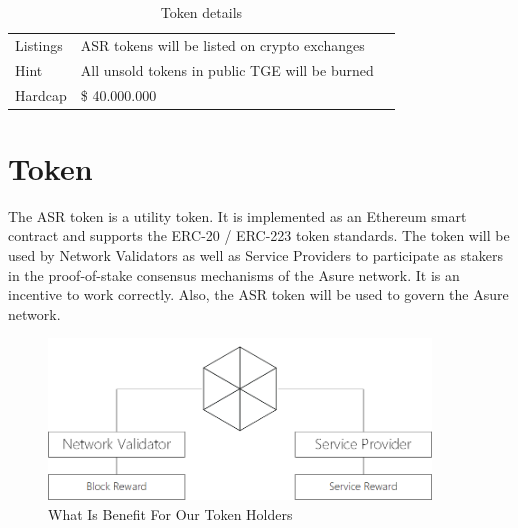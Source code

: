 \begin{table}[H]
\begin{tabular}{lp{}l}

  Listings & ASR tokens will be listed on crypto exchanges \\

  Hint & All unsold tokens in public TGE  will be burned \\\hline  
  
  Hardcap & \$ 40.000.000
  
\end{tabular}
\caption{\label{tab:table-name}Token details}
\end{table}

\section{Token}

The ASR token is a utility token. It is implemented as an Ethereum smart contract and supports the ERC-20 / ERC-223 token standards. The token will be used by Network Validators as well as Service Providers to participate as stakers in the proof-of-stake consensus mechanisms of the Asure network. It is an incentive to work correctly. Also, the ASR token will be used to govern the Asure network.

\begin{figure}[H]
    \centering
    \includegraphics[width=4.0in]{img/staking.png}
    \caption{What Is Benefit For Our Token Holders}
    \label{fig:asure_architecture}
\end{figure}


